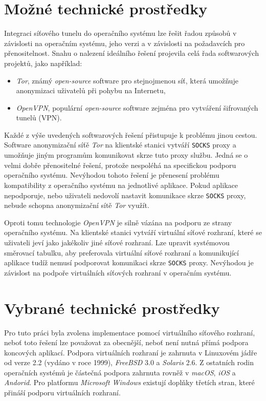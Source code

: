 \documentclass[thesis=M,czech]{FITthesis}[2012/10/20]
\begin{document}
\section{Možné technické prostředky}

Integraci síťového tunelu do operačního systému lze řešit řadou způsobů v závislosti na operačním systému, jeho verzi a v závislosti na požadavcích pro přenositelnost. Snahu o nalezení ideálního řešení projevila celá řada softwarových projektů, jako například:

\begin{itemize}
 \item \textit{Tor}, známý \textit{open-source} software pro stejnojmenou síť, která umožňuje anonymizaci uživatelů při pohybu na Internetu,
 \item \textit{OpenVPN}, populární \textit{open-source} software zejména pro vytváření šifrovaných tunelů (VPN).
\end{itemize}

Každé z výše uvedených softwarových řešení přistupuje k problému jinou cestou. Software anonymizační síťě \textit{Tor} na klientské stanici vytváří \texttt{SOCKS} proxy a umožňuje jiným programům komunikovat skrze tuto proxy službu. Jedná se o velmi dobře přenositelné řešení, protože nespoléhá na specifickou podporu operačního systému. Nevýhodou tohoto řešení je přenesení problému kompatibility z operačního systému na jednotlivé aplikace. Pokud aplikace nepodporuje, nebo uživateli nedovolí nastavit komunikace skrze \texttt{SOCKS} proxy, nebude schopna anonymizační sítě \textit{Tor} využít.

Oproti tomu technologie \textit{OpenVPN} je silně vázána na podporu ze strany operačního systému. Na klientské stanici vytváří virtuální síťové rozhraní, které se uživateli jeví jako jakékoliv jiné síťové rozhraní. Lze upravit systémovou směrovací tabulku, aby preferovala virtuální síťové rozhraní a komunikující aplikace tudíž nemusí podporovat komunikaci skrze \texttt{SOCKS} proxy. Nevýhodou je závislost na podpoře virtuálních síťových rozhraní v operačním systému.

\section{Vybrané technické prostředky}

Pro tuto práci byla zvolena implementace pomocí virtuálního síťového rozhraní, neboť toto řešení lze považovat za obecnější, neboť není nutná přímá podpora koncových aplikací. Podpora virtuálních rozhraní je zahrnuta v Linuxovém jádře od verze 2.2 (vydáno v roce 1999), \textit{FreeBSD} 3.0 a \textit{Solaris} 2.6. Z ostatních rodin operačních systémů je částečná podpora zahrnuta rovněž v \textit{macOS}, \textit{iOS} a \textit{Andorid}. Pro platformu \textit{Microsoft Windows} existují doplňky třetích stran, které přináší podporu virtuálních rozhraní.
\end{document}
